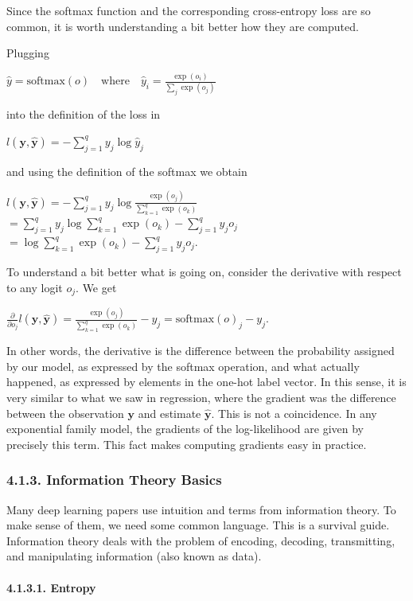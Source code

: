 \documentclass[11pt]{article}
\begin{document}
    Since the softmax function and the corresponding cross-entropy loss are
so common, it is worth understanding a bit better how they are computed.

Plugging

\(\hat{y} = \text{softmax}(o) \quad \text{where} \quad \hat{y}_i = \frac{\exp(o_i)}{\sum_j \exp(o_j)}\)

into the definition of the loss in

\(l(\mathbf{y}, \hat{\mathbf{y}}) = - \sum_{j=1}^{q} y_j \log \hat{y}_j\)

and using the definition of the softmax we obtain

\(l(\mathbf{y}, \hat{\mathbf{y}}) = - \sum_{j=1}^{q} y_j \log \frac{\exp(o_j)}{\sum_{k=1}^{q} \exp(o_k)}\)
\(= \sum_{j=1}^{q} y_j \log \sum_{k=1}^{q} \exp(o_k) - \sum_{j=1}^{q} y_j o_j\)
\(= \log \sum_{k=1}^{q} \exp(o_k) - \sum_{j=1}^{q} y_j o_j\).

To understand a bit better what is going on, consider the derivative
with respect to any logit \(o_j\). We get

\(\frac{\partial}{\partial o_j} l(\mathbf{y}, \hat{\mathbf{y}}) = \frac{\exp(o_j)}{\sum_{k=1}^{q} \exp(o_k)} - y_j = \text{softmax}(o)_j - y_j\).

In other words, the derivative is the difference between the probability
assigned by our model, as expressed by the softmax operation, and what
actually happened, as expressed by elements in the one-hot label vector.
In this sense, it is very similar to what we saw in regression, where
the gradient was the difference between the observation \(\mathbf{y}\)
and estimate \(\hat{\mathbf{y}}\). This is not a coincidence. In any
exponential family model, the gradients of the log-likelihood are given
by precisely this term. This fact makes computing gradients easy in
practice.

    \subsubsection*{4.1.3. Information Theory
Basics}\label{information-theory-basics}

    Many deep learning papers use intuition and terms from information
theory. To make sense of them, we need some common language. This is a
survival guide. Information theory deals with the problem of encoding,
decoding, transmitting, and manipulating information (also known as
data).

    \paragraph{4.1.3.1. Entropy}\label{entropy} \mbox{}
\end{document}
